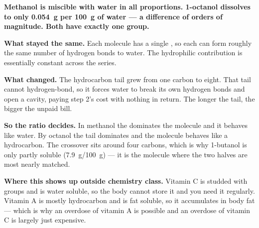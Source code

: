 \documentclass{apchem-worksheet}
\begin{document}
\begin{center}
\end{center}

\begin{workedexample}
\textbf{Methanol is miscible with water in all proportions.
1-octanol dissolves to only \SI{0.054}{\gram} per \SI{100}{\gram} of
water --- a difference of orders of magnitude. Both have exactly one
 group.}

\textbf{What stayed the same.} Each molecule has a single , so
each can form roughly the same number of hydrogen bonds to water. The
hydrophilic contribution is essentially constant across the series.

\textbf{What changed.} The hydrocarbon tail grew from one carbon to
eight. That tail cannot hydrogen-bond, so it forces water to break its
own hydrogen bonds and open a cavity, paying step 2's cost with nothing
in return. The longer the tail, the bigger the unpaid bill.

\textbf{So the ratio decides.} In methanol the  dominates the
molecule and it behaves like water. By octanol the tail dominates and
the molecule behaves like a hydrocarbon. The crossover sits around four
carbons, which is why 1-butanol is only partly soluble
(\SI{7.9}{\gram}/\SI{100}{\gram}) --- it is the molecule where the two
halves are most nearly matched.

\textbf{Where this shows up outside chemistry class.} Vitamin C is
studded with  groups and is water soluble, so the body cannot
store it and you need it regularly. Vitamin A is mostly hydrocarbon and
is fat soluble, so it accumulates in body fat --- which is why an
overdose of vitamin A is possible and an overdose of vitamin C is
largely just expensive.
\end{workedexample}
\end{document}
